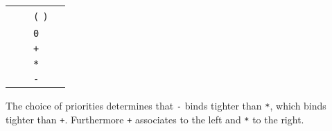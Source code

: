 \begin{isabellebody}
\begin{isamarkuptext}
  \begin{center}
  \begin{tabular}{rclr}
  \isa{{\isachardoublequote}A\isactrlsup {\isacharparenleft}\isactrlsup {\isadigit{1}}\isactrlsup {\isadigit{0}}\isactrlsup {\isadigit{0}}\isactrlsup {\isadigit{0}}\isactrlsup {\isacharparenright}{\isachardoublequote}} & \isa{{\isachardoublequote}{\isacharequal}{\isachardoublequote}} & \verb|(| \isa{{\isachardoublequote}A\isactrlsup {\isacharparenleft}\isactrlsup {\isadigit{0}}\isactrlsup {\isacharparenright}{\isachardoublequote}} \verb|)| \\
  \isa{{\isachardoublequote}A\isactrlsup {\isacharparenleft}\isactrlsup {\isadigit{1}}\isactrlsup {\isadigit{0}}\isactrlsup {\isadigit{0}}\isactrlsup {\isadigit{0}}\isactrlsup {\isacharparenright}{\isachardoublequote}} & \isa{{\isachardoublequote}{\isacharequal}{\isachardoublequote}} & \verb|0| \\
  \isa{{\isachardoublequote}A\isactrlsup {\isacharparenleft}\isactrlsup {\isadigit{0}}\isactrlsup {\isacharparenright}{\isachardoublequote}} & \isa{{\isachardoublequote}{\isacharequal}{\isachardoublequote}} & \isa{{\isachardoublequote}A\isactrlsup {\isacharparenleft}\isactrlsup {\isadigit{0}}\isactrlsup {\isacharparenright}{\isachardoublequote}} \verb|+| \isa{{\isachardoublequote}A\isactrlsup {\isacharparenleft}\isactrlsup {\isadigit{1}}\isactrlsup {\isacharparenright}{\isachardoublequote}} \\
  \isa{{\isachardoublequote}A\isactrlsup {\isacharparenleft}\isactrlsup {\isadigit{2}}\isactrlsup {\isacharparenright}{\isachardoublequote}} & \isa{{\isachardoublequote}{\isacharequal}{\isachardoublequote}} & \isa{{\isachardoublequote}A\isactrlsup {\isacharparenleft}\isactrlsup {\isadigit{3}}\isactrlsup {\isacharparenright}{\isachardoublequote}} \verb|*| \isa{{\isachardoublequote}A\isactrlsup {\isacharparenleft}\isactrlsup {\isadigit{2}}\isactrlsup {\isacharparenright}{\isachardoublequote}} \\
  \isa{{\isachardoublequote}A\isactrlsup {\isacharparenleft}\isactrlsup {\isadigit{3}}\isactrlsup {\isacharparenright}{\isachardoublequote}} & \isa{{\isachardoublequote}{\isacharequal}{\isachardoublequote}} & \verb|-| \isa{{\isachardoublequote}A\isactrlsup {\isacharparenleft}\isactrlsup {\isadigit{3}}\isactrlsup {\isacharparenright}{\isachardoublequote}} \\
  \end{tabular}
  \end{center}
  The choice of priorities determines that \verb|-| binds
  tighter than \verb|*|, which binds tighter than \verb|+|.  Furthermore \verb|+| associates to the left and
  \verb|*| to the right.


\end{isamarkuptext}
\end{isabellebody}
